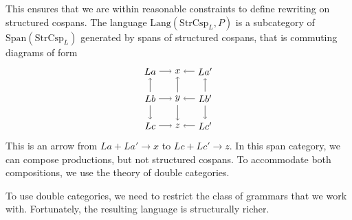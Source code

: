 \documentclass{amsart}
\newcommand{\Span}{\cat{Span}}
\newcommand{\StrCsp}{\cat{StrCsp}}
\newcommand{\Lang}{\mathrm{Lang}}
\newcommand{\cat}[1]{\mathrm{#1}}
\newcommand{\csp}[3]{#1 + #3 \to #2}
\theoremstyle{remark}
\theoremstyle{definition}
\begin{document}
This ensures that we are within reasonable
constraints to define rewriting on structured cospans. The language
$ \Lang ( \StrCsp_{L} , P ) $ is a subcategory of
$ \Span ( \StrCsp_{L} ) $ generated by spans of structured cospans,
that is commuting diagrams of form
%
\[
  \begin{tikzpicture}
    \node (1) at (0,2) {\( La \)};
    \node (2) at (1,2) {\( x \)};
    \node (3) at (2,2) {\( La' \)};
    \node (4) at (0,1) {\( Lb \)};
    \node (5) at (1,1) {\( y \)};
    \node (6) at (2,1) {\( Lb' \)};
    \node (7) at (0,0) {\( Lc \)};
    \node (8) at (1,0) {\( z \)};
    \node (9) at (2,0) {\( Lc' \)};
    \draw [->] (1) to node [] {\scriptsize{\(  \)}} (2);
    \draw [->] (3) to node [] {\scriptsize{\(  \)}} (2);
    \draw [->] (4) to node [] {\scriptsize{\(  \)}} (5);
    \draw [->] (6) to node [] {\scriptsize{\(  \)}} (5);
    \draw [->] (7) to node [] {\scriptsize{\(  \)}} (8);
    \draw [->] (9) to node [] {\scriptsize{\(  \)}} (8);
    \draw [->] (4) to node [] {\scriptsize{\(  \)}} (1);
    \draw [->] (4) to node [] {\scriptsize{\(  \)}} (7);
    \draw [->] (5) to node [] {\scriptsize{\(  \)}} (2);
    \draw [->] (5) to node [] {\scriptsize{\(  \)}} (8);
    \draw [->] (6) to node [] {\scriptsize{\(  \)}} (3);
    \draw [->] (6) to node [] {\scriptsize{\(  \)}} (9); 
  \end{tikzpicture}
\]
% 
This is an arrow from $ \csp{La}{x}{La'}$ to $ \csp{Lc}{z}{Lc'} $. In
this span category, we can compose productions, but not structured
cospans.  To accommodate both compositions, we use the theory of
double categories.

To use double categories, we need to restrict the class of grammars
that we work with.  Fortunately, the resulting language is
structurally richer. 
\end{document}
